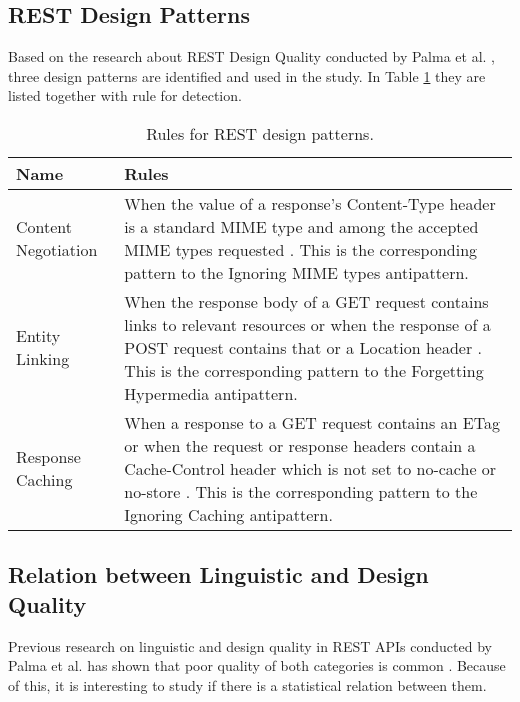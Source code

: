\subsection{REST Design Patterns}
\label{designPatterns}
Based on the research about REST Design Quality conducted by Palma et al. \cite{design}, three design patterns are identified and used in the study. In Table \ref{tab:RulesforRESTdesignpatterns} they are listed together with rule for detection.

\begin{center}
\begin{table}[!ht]
\small
\begin{tabular}{|p{5cm}|p{9cm}|}
\hline \textbf{Name} & \textbf{Rules} \\
\hline 
Content Negotiation &
When the value of a response’s Content-Type header is a standard MIME type and among the accepted MIME types requested \cite{design}. This is the corresponding pattern to the Ignoring MIME types antipattern.

\\ \hline
Entity Linking &
When the response body of a GET request contains links to relevant resources or when the response of a POST request contains that or a Location header \cite{design}. This is the corresponding pattern to the Forgetting Hypermedia antipattern. 

\\ \hline
Response Caching &
When a response to a GET request contains an ETag or when the request or response headers contain a Cache-Control header which is not set to no-cache or no-store \cite{design}. This is the corresponding pattern to the  Ignoring Caching antipattern. 

\\ \hline
\end{tabular}
 \caption{Rules for REST design patterns.}
 \label{tab:RulesforRESTdesignpatterns}
\end{table}
\end{center}


\subsection{Relation between Linguistic and Design Quality}

Previous research on linguistic and design quality in REST APIs conducted by Palma et al. has shown that poor quality of both categories is common \cite{linguistic}\cite{design}. Because of this, it is interesting to study if there is a statistical relation between them.


